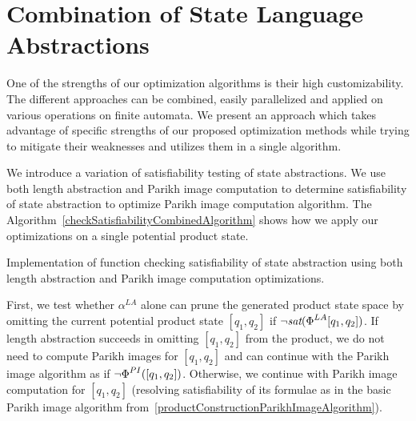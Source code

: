 
\section{Combination of State Language Abstractions}

One of the strengths of our optimization algorithms is their high customizability. The different approaches can be combined, easily parallelized and applied on various operations on finite automata. We present an approach which takes advantage of specific strengths of our proposed optimization methods while trying to mitigate their weaknesses and utilizes them in a single algorithm.

We introduce a variation of satisfiability testing of state abstractions. We use both length abstraction and Parikh image computation to determine satisfiability of state abstraction to optimize Parikh image computation algorithm. The Algorithm~\ref{checkSatisfiabilityCombinedAlgorithm} shows how we apply our optimizations on a single potential product state.

\begin{algorithm}[ht]
\caption{Implementation of function checking satisfiability of state abstraction using both length abstraction and Parikh image computation optimizations.}\label{checkSatisfiabilityCombinedAlgorithm}



\DontPrintSemicolon

\end{algorithm}

First, we test whether $\alpha^{LA}$ alone can prune the generated product state space by omitting the current potential product state $[q_1, q_2]$ if $\neg \emph{sat}(\emph{$\Phi$}^{LA}{[q_1, q_2]})$. If length abstraction succeeds in omitting $[q_1, q_2]$ from the product, we do not need to compute Parikh images for $[q_1, q_2]$ and can continue with the Parikh image algorithm as if $\neg \emph{$\Phi$}^{PI}([q_1, q_2])$. Otherwise, we continue with Parikh image computation for $[q_1, q_2]$ (resolving satisfiability of its formulae as in the basic Parikh image algorithm from~\ref{productConstructionParikhImageAlgorithm}).

